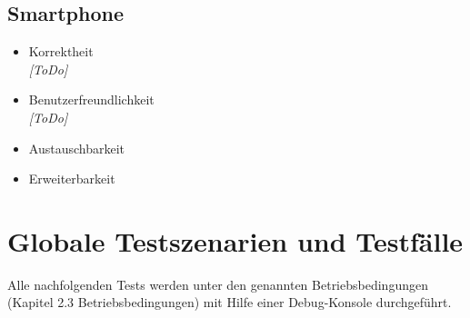 \documentclass[10pt,a4paper]{article}
\let\oldsection\section
\renewcommand{\section}{\newpage \oldsection}
\begin{document}
		\subsection{Smartphone}
			\begin{itemize}
				\item Korrektheit
					\\ \textsl{[ToDo]}
				\item Benutzerfreundlichkeit
					\\ \textsl{[ToDo]}
				\item Austauschbarkeit
					\\ \textsl{}						
				\item Erweiterbarkeit
					\\ \textsl{}					
			\end{itemize}
	
	\section{Globale Testszenarien und Testfälle}	
		Alle nachfolgenden Tests werden unter den genannten Betriebsbedingungen (Kapitel 2.3 Betriebsbedingungen)
		mit Hilfe einer Debug-Konsole durchgeführt.
\end{document}
